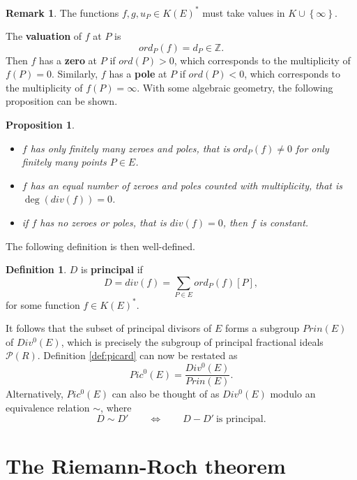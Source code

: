 \documentclass{article}
\theoremstyle{plain}
\newtheorem{proposition}[n]{Proposition}
\theoremstyle{definition}
\newtheorem{definition}[n]{Definition}
\newtheorem{remark}[n]{Remark}
\newcommand{\rb}[1]{\left( #1 \right)}
\renewcommand{\sb}[1]{\left[ #1 \right]}
\newcommand{\cb}[1]{\left\{ #1 \right\}}
\newcommand{\Z}{\mathbb{Z}}
\newcommand{\PP}{\mathcal{P}}
\begin{document}
\begin{remark}
The functions $ f, g, u_P \in K\rb{E}^* $ must take values in $ K \cup \cb{\infty} $.
\end{remark}

The \textbf{valuation} of $ f $ at $ P $ is
$$ ord_P\rb{f} = d_P \in \Z. $$
Then $ f $ has a \textbf{zero} at $ P $ if $ ord\rb{P} > 0 $, which corresponds to the multiplicity of $ f\rb{P} = 0 $. Similarly, $ f $ has a \textbf{pole} at $ P $ if $ ord\rb{P} < 0 $, which corresponds to the multiplicity of $ f\rb{P} = \infty $. With some algebraic geometry, the following proposition can be shown.

\begin{proposition}
\label{prop:ag}
\hfill
\begin{itemize}
\item $ f $ has only finitely many zeroes and poles, that is $ ord_P\rb{f} \ne 0 $ for only finitely many points $ P \in E $.
\item $ f $ has an equal number of zeroes and poles counted with multiplicity, that is $ \deg\rb{div\rb{f}} = 0 $.
\item if $ f $ has no zeroes or poles, that is $ div\rb{f} = 0 $, then $ f $ is constant.
\end{itemize}
\end{proposition}

The following definition is then well-defined.

\begin{definition}
$ D $ is \textbf{principal} if
$$ D = div\rb{f} = \sum_{P \in E} ord_P\rb{f}\sb{P}, $$
for some function $ f \in K\rb{E}^* $.
\end{definition}

It follows that the subset of principal divisors of $ E $ forms a subgroup $ Prin\rb{E} $ of $ Div^0\rb{E} $, which is precisely the subgroup of principal fractional ideals $ \PP\rb{R} $. Definition \ref{def:picard} can now be restated as
$$ Pic^0\rb{E} = \dfrac{Div^0\rb{E}}{Prin\rb{E}}. $$
Alternatively, $ Pic^0\rb{E} $ can also be thought of as $ Div^0\rb{E} $ modulo an equivalence relation $ \sim $, where
$$ D \sim D' \qquad \iff \qquad D - D' \ \text{is principal}. $$

\pagebreak

\section{The Riemann-Roch theorem}
\end{document}
